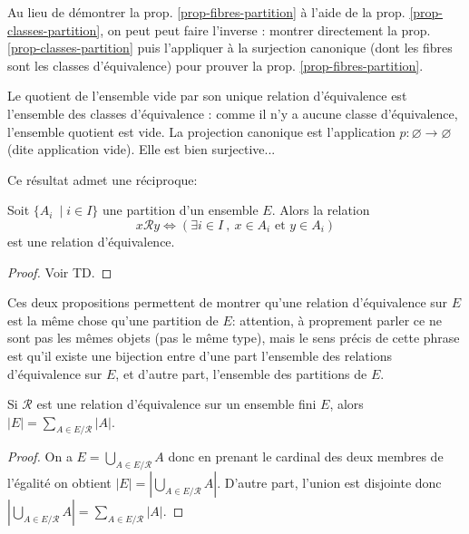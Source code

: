 \begin{remarque}
Au lieu de démontrer la prop. \ref{prop-fibres-partition} à l'aide de la prop. \ref{prop-classes-partition}, on peut peut faire l'inverse : montrer directement la prop. \ref{prop-classes-partition} puis l'appliquer à la surjection canonique (dont les fibres sont les classes d'équivalence) pour prouver  la prop. \ref{prop-fibres-partition}.
\end{remarque}


\begin{remarque}[Zérologie] Le quotient de l'ensemble vide par son unique relation d'équivalence est l'ensemble des classes d'équivalence : comme il n'y a aucune classe d'équivalence, l'ensemble quotient est vide. La projection canonique est l'application $p : \varnothing \to \varnothing$ (dite application vide). Elle est bien surjective...
\end{remarque}

Ce résultat admet une \og réciproque\fg : 

\begin{proposition}
Soit $\{A_i\:\mid i\in I\}$ une partition d'un ensemble $E$. Alors la relation
\[
x\mathcal R y \iff \left( \exists i\in I\:,\: x\in A_i\text{ et } y\in A_i\right)
\]
est une relation d'équivalence.
\end{proposition}
\begin{proof}
Voir TD.
\end{proof}

Ces deux propositions permettent de montrer qu'\og une relation d'équivalence sur $E$ est la même chose qu'une partition de $E$\fg : attention, à proprement parler ce ne sont pas les mêmes objets (pas le même type), mais le sens précis de cette phrase est qu'il existe une bijection entre d'une part l'ensemble des relations d'équivalence sur $E$, et d'autre part, l'ensemble des partitions de $E$.

\begin{corollaire}
Si $\mathcal R$ est une relation d'équivalence sur un ensemble fini $E$, alors $|E| = \sum_{A\in E/\mathcal R} |A|$.
\end{corollaire}
\begin{proof}
On a  $E= \bigcup_{A\in E/\mathcal R} A$ donc en prenant le cardinal des deux membres de l'égalité on obtient $|E| = \left| \bigcup_{A\in E/\mathcal R} A \right|$. D'autre part, l'union est disjointe donc $\left| \bigcup_{A\in E/\mathcal R} A \right| = \sum_{A\in E/\mathcal R} |A|$.
\end{proof}

